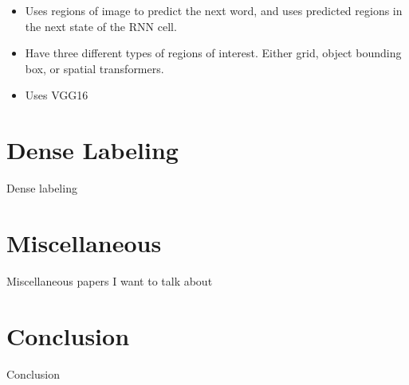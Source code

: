 \documentclass[10pt,twocolumn,letterpaper]{article}
\begin{document}
\begin{itemize}
  \item Uses regions of image to predict the next word, and uses predicted
        regions in the next state of the RNN cell.
  \item Have three different types of regions of interest. Either grid, object
        bounding box, or spatial transformers.
  \item Uses VGG16
\end{itemize}

\section{Dense Labeling}

Dense labeling

\section{Miscellaneous}

Miscellaneous papers I want to talk about

\section{Conclusion}

Conclusion

{\small


}
\end{document}
